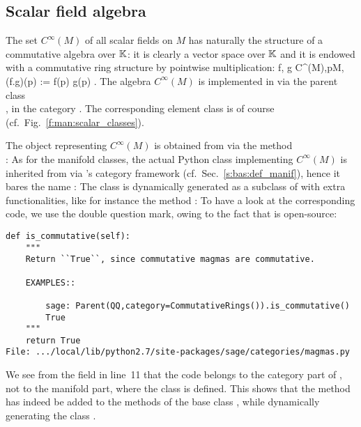 \subsection{Scalar field algebra} \label{s:man:scal_algebra}

The set $C^\infty(M)$
of all scalar fields on $M$ has naturally the structure of a
commutative algebra over $\mathbb{K}$: it is clearly a vector
space over $\mathbb{K}$ and it is endowed with a commutative ring structure
by pointwise multiplication:
\be
\forall f, g \in C^\infty(M),\quad \forall p\in M,\quad
(f.g)(p) := f(p) g(p) .
\ee
The algebra $C^\infty(M)$ is implemented in \Sage{} via the parent
class\\ , in the category
. The corresponding element class
is of course  (cf.\ Fig.~\ref{f:man:scalar_classes}).

The \Sage{} object representing $C^\infty(M)$ is obtained from  via the
method\\ :
As for the manifold classes, the actual Python class implementing
$C^\infty(M)$ is inherited from  via \Sage{}'s
category framework (cf.\ Sec.~\ref{s:bas:def_manif}), hence it bares the name :
The class  is dynamically generated
as a subclass of  with extra functionalities, like
for instance the method :
To have a look at the corresponding code,
we use the double question mark, owing to the fact that \Sage{} is open-source:
\begin{lstlisting}
def is_commutative(self):
    """
    Return ``True``, since commutative magmas are commutative.

    EXAMPLES::

        sage: Parent(QQ,category=CommutativeRings()).is_commutative()
        True
    """
    return True
File: .../local/lib/python2.7/site-packages/sage/categories/magmas.py
\end{lstlisting}
We see from the  field in line~11 that the code belongs to the category part of \Sage{}, not to the
manifold part, where the class  is defined.
This shows that the method  has indeed be
added to the methods of the base class , while
dynamically generating the class  .

